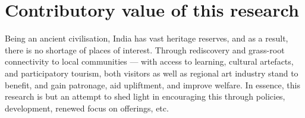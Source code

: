 \section{Contributory value of this research} %
\label{sec:cvalue}

Being an ancient civilisation, India has vast heritage reserves, and as a result, there is no shortage of places of interest. Through rediscovery and grass-root connectivity to local communities --- with access to learning, cultural artefacts, and participatory tourism, both visitors as well as regional art industry stand to benefit, and gain patronage, aid upliftment, and improve welfare. In essence, this research is but an attempt to shed light in encouraging this through policies, development, renewed focus on offerings, etc.


